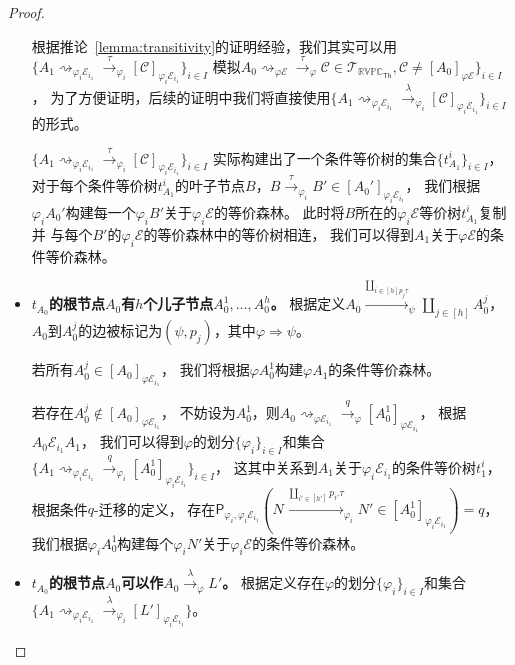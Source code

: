 \begin{proof}
\begin{itemize}
{         根据推论~\ref{lemma:transitivity}的证明经验，我们其实可以用$\{A_1\rightsquigarrow_{\varphi_i\mathcal{E}_{i_1}}\stackrel{\tau}{\rightarrow}_{\varphi_i}[\mathcal{C}]_{\varphi_i\mathcal{E}_{i_1}}\}_{i\in I}$
         模拟$A_0\rightsquigarrow_{\varphi\mathcal{E}}\stackrel{\tau}{\rightarrow}_{\varphi} \mathcal{C}\in \mathcal{T}_{\mathbb{RVPC}_{\mathsf{Th}}},\mathcal{C}\neq [A_0]_{\varphi\mathcal{E}}\}_{i\in I}$，
         为了方便证明，后续的证明中我们将直接使用$\{A_1\rightsquigarrow_{\varphi_i\mathcal{E}_{i_1}}\stackrel{\lambda}{\rightarrow}_{\varphi_i}[\mathcal{C}]_{\varphi_i\mathcal{E}_{i_1}}\}_{i\in I}$的形式。
         
         $\{A_1\rightsquigarrow_{\varphi_i\mathcal{E}_{i_1}}\stackrel{\tau}{\rightarrow}_{\varphi_i}[\mathcal{C}]_{\varphi_i\mathcal{E}_{i_1}}\}_{i\in I}$
         实际构建出了一个条件等价树的集合$\{t_{A_1}^{i}\}_{i\in I}$，
         对于每个条件等价树$t_{A_1}^i$的叶子节点$B$，$B\stackrel{\tau}{\rightarrow}_{\varphi_i}B'\in [A_0']_{\varphi_i\mathcal{E}_{i_1}}$，
         我们根据$\varphi_i A_0'$构建每一个$\varphi_i B'$关于$\varphi_i\mathcal{E}$的等价森林。
         此时将$B$所在的$\varphi_i\mathcal{E}$等价树$t_{A_1}^{i}$复制并
         与每个$B'$的$\varphi_i\mathcal{E}$的等价森林中的等价树相连，
         我们可以得到$A_1$关于$\varphi\mathcal{E}$的条件等价森林。
      }
      \item {
         \textbf{$t_{A_0}$的根节点$A_0$有$h$个儿子节点$A_0^1,\dots,A_0^h$。}
         根据定义$A_0\stackrel{\coprod_{i\in [h]p_j\tau}}{\rightarrow}_{\psi} \coprod_{j\in [h]}A_0^j$，
         $A_0$到$A_0^j$的边被标记为$(\psi, p_j)$，其中$\varphi\Rightarrow\psi$。

         若所有$A_0^j\in [A_0]_{\varphi\mathcal{E}_{i_1}}$，
         我们将根据$\varphi A_0^1$构建$\varphi A_1$的条件等价森林。

         若存在$A_0^j\notin [A_0]_{\varphi\mathcal{E}_{i_1}}$，
         不妨设为$A_0^1$，则$A_0\rightsquigarrow_{\varphi\mathcal{E}_{i_1}}\stackrel{q}{\rightarrow}_{\varphi} [A_0^1]_{\varphi\mathcal{E}_{i_1}}$，
         根据$A_0\mathcal{E}_{i_1}A_1$，
         我们可以得到$\varphi$的划分$\{\varphi_i\}_{i\in I}$和集合
         $\{A_1\rightsquigarrow_{\varphi_i\mathcal{E}_{i_1}}\stackrel{q}{\rightarrow}_{\varphi_i} [A_0^1]_{\varphi_i\mathcal{E}_{i_1}}\}_{i\in I}$，
         这其中关系到$A_1$关于$\varphi_i\mathcal{E}_{i_1}$的条件等价树$t_1^i$，
         根据条件$q$-迁移的定义，
         存在$\mathsf{P}_{\varphi_i,\varphi_i\mathcal{E}_{i_1}}(N\stackrel{\coprod_{i'\in [h']}p_{i'}\tau}{\longrightarrow}_{\varphi_i} N'\in [A_0^1]_{\varphi_i\mathcal{E}_{i_1}}) = q$，
         我们根据$\varphi_i A_0^1$构建每个$\varphi_i N'$关于$\varphi_i\mathcal{E}$的条件等价森林。
      }
      \item {
         \textbf{$t_{A_0}$的根节点$A_0$可以作$A_0\stackrel{\lambda}{\rightarrow}_{\varphi} L'$。}
         根据定义存在$\varphi$的划分$\{\varphi_i\}_{i\in I}$和集合
         $\{A_1\rightsquigarrow_{\varphi_i\mathcal{E}_{i_1}}\stackrel{\lambda}{\rightarrow}_{\varphi_i} [L']_{\varphi_i\mathcal{E}_{i_1}}\}$。
      }
   \end{itemize}


\end{proof}
